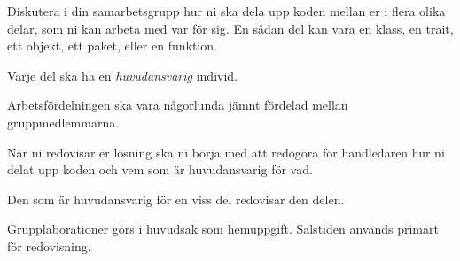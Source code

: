 \item 
Diskutera i din samarbetsgrupp hur ni ska dela upp koden mellan er i flera olika delar, som ni kan arbeta med var för sig. En sådan del kan vara en klass, en trait, ett objekt, ett paket, eller en funktion. 
\item
Varje del ska ha en \emph{huvudansvarig} individ. 
\item
Arbetsfördelningen ska vara någorlunda jämnt fördelad mellan gruppmedlemmarna.
\item
När ni redovisar er lösning ska ni börja med att redogöra för handledaren hur ni delat upp koden och vem som är huvudansvarig för vad. 
\item
Den som är huvudansvarig för en viss del redovisar den delen.
\item 
Grupplaborationer görs i huvudsak som hemuppgift. Salstiden används primärt för redovisning.